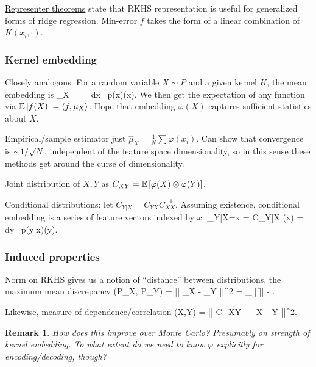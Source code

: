 \documentclass[notitlepage,openany,11pt]{report}
\theoremstyle{plain}%
\newtheorem{notethm}{Remark}
\newenvironment{notebox}
    {\noindent\colorlet{shadecolor}{cyan!15}\begin{shaded}\begin{notethm}}
    {\end{notethm}\end{shaded}}
\numberwithin{equation}{section}
\begin{document}
\href{https://en.wikipedia.org/wiki/Representer_theorem}{Representer theorems} state that RKHS representation is useful for generalized forms of ridge regression. Min-error $f$ takes the form of a linear combination of $K(x_{i}, \cdot)$. 


\subsubsection{Kernel embedding}

Closely analogous. For a random variable $X \sim P$ and a given kernel $K$, the mean embedding is
\be
\mu_{X} =  = \int \!dx \,  p(x)\varphi(x).
\ee
We then get the expectation of any function via $ \mathbb{E}\left[f(X) \right] = \langle f, \mu_{X} \rangle$. Hope that embedding $\varphi(X)$ captures sufficient statistics about $X$. 

Empirical/sample estimator just $\widehat{\mu}_{X} = \tfrac{1}{N} \sum \varphi(x_{i})$. Can show that convergence is $\sim 1/\sqrt{N}$, independent of the feature space dimensionality, so in this sense these methods get around the curse of dimensionality. 

Joint distribution of $X,Y$ as $C_{XY} = \mathbb{E}\left[\varphi(X) \otimes \varphi(Y) \right]$. 

Conditional distributions: let $C_{Y|X} = C_{YX}^{\phantom{-1}} C_{XX}^{-1}$. Assuming existence, conditional embedding is a series of feature vectors indexed by $x$:
\be
\mu_{Y|X=x} = C_{Y|X} \varphi(x) = \int \! dy \, p(y|x)\varphi(y).
\ee

\subsubsection{Induced properties}

Norm on RKHS gives us a notion of ``distance'' between distributions, the maximum mean discrepancy
\be
{}(P_{X}, P_{Y}) = || \mu_{X} - \mu_{Y} ||^{2} = \sup_{||f|| }  \left[ f(X) \right] -   \left[ f(Y) \right].
\ee

Likewise, measure of dependence/correlation
\be
{}(X,Y) = || C_{XY} - \mu_{X} \otimes \mu_{Y} ||^{2}.
\ee


\begin{notebox}
How does this improve over Monte Carlo? Presumably on strength of kernel embedding. To what extent do we need to know $\varphi$ explicitly for encoding/decoding, though?

\end{notebox}
\end{document}
